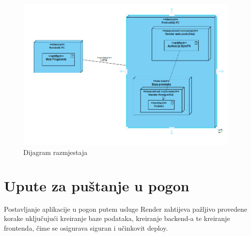 			\begin{figure}[H]
				\includegraphics[scale=0.6]{slike/Dijagram razmjestaja}
				\centering
				\caption{Dijagram razmjestaja}
				\label{fig:dijagramrazmjestaja}
			\end{figure}
		
		\section{Upute za puštanje u pogon}
 
			
			Postavljanje aplikacije u pogon putem usluge Render zahtijeva pažljivo provedene korake uključujući kreiranje baze podataka, kreiranje backend-a  te kreiranje frontenda, čime se osigurava siguran i učinkovit deploy.
			
